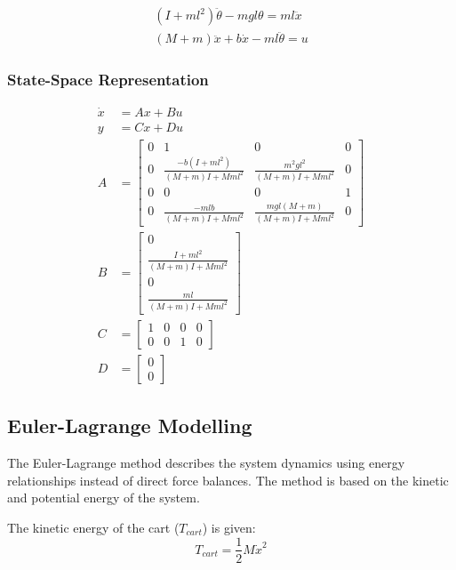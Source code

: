 \begin{align}
	(I + ml^2)\ddot{\theta} - mgl\theta = ml\ddot{x} \\
	(M+m)\ddot{x} + b\dot{x} - ml\ddot{\theta} = u
\end{align}

\subsubsection{State-Space Representation}

\begin{align}
	\dot{x} &= Ax + Bu \\
	y &= Cx + Du \\
	A &=
	\begin{bmatrix}
		0 & 1 & 0 & 0 \\
		0 & \frac{-b(I+ml^2)}{(M+m)I + Mm l^2} &
		\frac{m^2gl^2}{(M+m)I + Mm l^2} & 0 \\
		0 & 0 & 0 & 1 \\
		0 & \frac{-mlb}{(M+m)I + Mm l^2} &
		\frac{mgl(M+m)}{(M+m)I + Mm l^2} & 0
	\end{bmatrix} \\
	B &=
	\begin{bmatrix}
		0 \\
		\frac{I+ml^2}{(M+m)I + Mm l^2} \\
		0 \\
		\frac{ml}{(M+m)I + Mm l^2}
	\end{bmatrix} \\
	C &=
	\begin{bmatrix}
		1 & 0 & 0 & 0 \\
		0 & 0 & 1 & 0
	\end{bmatrix} \\
	D &=
	\begin{bmatrix}
		0 \\
		0
	\end{bmatrix}
\end{align}

\subsection{Euler-Lagrange Modelling}

The Euler-Lagrange method describes the system dynamics using energy relationships instead of direct force balances. The method is based on the kinetic and potential energy of the system. \cite{Euler-lagrange}

The kinetic energy of the cart ($T_{cart}$) is given:
\begin{equation}
	T_{cart} = \frac{1}{2}M\dot{x}^2
\end{equation}

